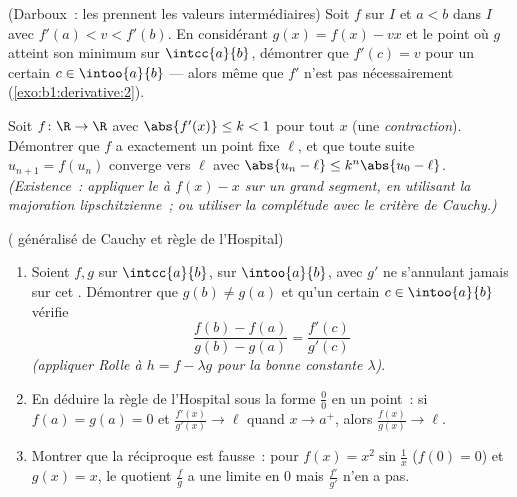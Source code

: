 \begin{exercise}[$\star\star\star$]\label{exo:b1:derivative:10}
(Darboux~: les  prennent les valeurs intermédiaires) Soit $f$
 sur $I$ et $a < b$ dans $I$ avec $f'(a) < v < f'(b)$.
En considérant $g(x) = f(x) - vx$ et le point où $g$ atteint
son minimum sur $\intcc{a}{b}$, démontrer que $f'(c) = v$ pour un certain $c
\in \intoo{a}{b}$ --- alors même que $f'$ n'est pas nécessairement 
(\cref{exo:b1:derivative:2}).
\end{exercise}

\begin{exercise}[$\star\star\star$]\label{exo:b1:derivative:11}
Soit $f \colon \R \to \R$  avec $\abs{f'(x)} \leq k
< 1$ pour tout $x$ (une \emph{contraction}). Démontrer que $f$ a exactement
un point fixe $\ell$, et que toute suite $u_{n+1} = f(u_n)$
converge vers $\ell$ avec $\abs{u_n - \ell} \leq k^n\abs{u_0 -
\ell}$. \emph{(Existence~: appliquer le  à
$f(x) - x$ sur un grand segment, en utilisant la majoration lipschitzienne~; ou
utiliser la complétude avec le critère de Cauchy.)}
\end{exercise}

\begin{exercise}[$\star\star\star$]\label{exo:b1:derivative:12}
( généralisé de Cauchy et règle de l'Hospital)
\begin{enumerate}
  \item Soient $f, g$  sur $\intcc{a}{b}$,
         sur $\intoo{a}{b}$, avec $g'$ ne s'annulant jamais
        sur cet . Démontrer que $g(b) \neq g(a)$ et qu'un certain $c \in
        \intoo{a}{b}$ vérifie
        \[
        \frac{f(b) - f(a)}{g(b) - g(a)} = \frac{f'(c)}{g'(c)}
        \]
        \emph{(appliquer Rolle à $h = f - \lambda g$ pour la bonne
        constante $\lambda$)}.
  \item En déduire la règle de l'Hospital sous la forme $\frac00$ en un
        point~: si $f(a) = g(a) = 0$ et
        $\frac{f'(x)}{g'(x)} \to \ell$ quand $x \to a^+$, alors
        $\frac{f(x)}{g(x)} \to \ell$.
  \item Montrer que la réciproque est fausse~: pour $f(x) = x^2\sin\frac1x$
        ($f(0) = 0$) et $g(x) = x$, le quotient
        $\frac{f}{g}$ a une limite en $0$ mais
        $\frac{f'}{g'}$ n'en a pas.
\end{enumerate}
\end{exercise}

